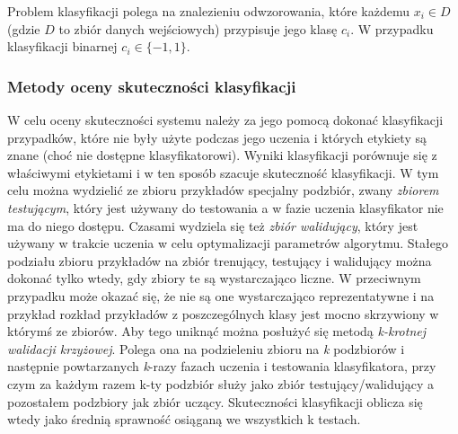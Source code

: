 Problem klasyfikacji polega na znalezieniu odwzorowania, które każdemu $ x_i \in D $ (gdzie $ D $ to zbiór danych wejściowych) przypisuje jego klasę $ c_i $. W przypadku klasyfikacji binarnej $ c_i \in \{ -1, 1 \} $.

\subsubsection{Metody oceny skuteczności klasyfikacji}

W celu oceny skuteczności systemu należy za jego pomocą dokonać klasyfikacji przypadków, które nie były użyte podczas jego uczenia i których etykiety są znane (choć nie dostępne klasyfikatorowi). Wyniki klasyfikacji porównuje się z właściwymi etykietami i w ten sposób szacuje skuteczność klasyfikacji.
W tym celu można wydzielić ze zbioru przykładów specjalny podzbiór, zwany \emph{zbiorem testującym}, który jest używany do testowania a w fazie uczenia klasyfikator nie ma do niego dostępu. Czasami wydziela się też \emph{zbiór walidujący}, który jest używany w trakcie uczenia w celu optymalizacji parametrów algorytmu.
Stałego podziału zbioru przykładów na zbiór trenujący, testujący i walidujący można dokonać tylko wtedy, gdy zbiory te są wystarczająco liczne. W przeciwnym przypadku może okazać się, że nie są one wystarczająco reprezentatywne i na przykład rozkład przykładów z poszczególnych klasy jest mocno skrzywiony w którymś ze zbiorów. Aby tego uniknąć można posłużyć się metodą \emph{k-krotnej walidacji krzyżowej}. Polega ona na podzieleniu zbioru na \emph{k} podzbiorów i następnie powtarzanych \emph{k}-razy fazach uczenia i testowania klasyfikatora, przy czym za każdym razem k-ty podzbiór służy jako zbiór testujący/walidujący a pozostałem podzbiory jak zbiór uczący. Skuteczności klasyfikacji oblicza się wtedy jako średnią sprawność osiąganą we wszystkich k testach.

